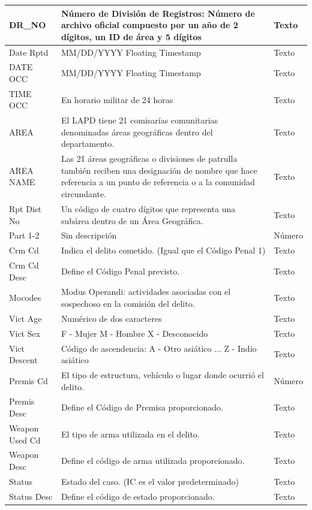 \begin{longtable}{|p{2.5cm}|p{6cm}|p{5cm}|}
	DR\_NO & Número de División de Registros: Número de archivo oficial compuesto por un año de 2 dígitos, un ID de área y 5 dígitos & Texto \\
	\hline
	Date Rptd & MM/DD/YYYY Floating Timestamp & Texto \\
	\hline
	DATE OCC & MM/DD/YYYY Floating Timestamp & Texto \\
	\hline
	TIME OCC & En horario militar de 24 horas & Texto \\
	\hline
	AREA & El LAPD tiene 21 comisarías comunitarias denominadas áreas geográficas dentro del departamento. & Texto \\
	\hline
	AREA NAME & Las 21 áreas geográficas o divisiones de patrulla también reciben una designación de nombre que hace referencia a un punto de referencia o a la comunidad circundante. & Texto \\
	\hline
	Rpt Dist No & Un código de cuatro dígitos que representa una subárea dentro de un Área Geográfica. & Texto \\
	\hline
	Part 1-2 & Sin descripción & Número \\
	\hline
	Crm Cd & Indica el delito cometido. (Igual que el Código Penal 1) & Texto \\
	\hline
	Crm Cd Desc & Define el Código Penal previsto. & Texto \\
	\hline
	Mocodes & Modus Operandi: actividades asociadas con el sospechoso en la comisión del delito. & Texto \\
	\hline
	Vict Age & Numérico de dos caracteres & Texto \\
	\hline
	Vict Sex & F - Mujer M - Hombre X - Desconocido & Texto \\
	\hline
	Vict Descent & Código de ascendencia: A - Otro asiático ... Z - Indio asiático & Texto \\
	\hline
	Premis Cd & El tipo de estructura, vehículo o lugar donde ocurrió el delito. & Número \\
	\hline
	Premis Desc & Define el Código de Premisa proporcionado. & Texto \\
	\hline
	Weapon Used Cd & El tipo de arma utilizada en el delito. & Texto \\
	\hline
	Weapon Desc & Define el código de arma utilizada proporcionado. & Texto \\
	\hline
	Status & Estado del caso. (IC es el valor predeterminado) & Texto \\
	\hline
	Status Desc & Define el código de estado proporcionado. & Texto \\
	\hline

\end{longtable}
